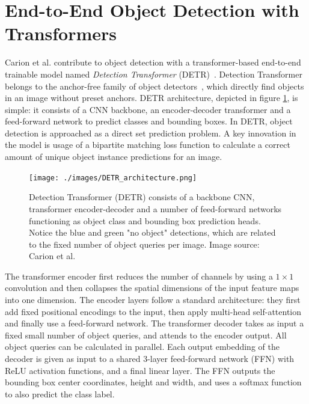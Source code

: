 \documentclass[english,twoside,openright]{HYgraduMLDS}
\begin{document}
\section{End-to-End Object Detection with Transformers}
\label{section:DETR}
Carion et al. contribute to object detection with a transformer-based end-to-end trainable model named \textit{Detection Transformer} (DETR)~\cite{DETR}. Detection Transformer belongs to the anchor-free family of object detectors~\cite{BridgingObjectAnchor}, which directly find objects in an image without preset anchors. DETR architecture, depicted in figure \ref{fig:DETR}, is simple: it consists of a CNN backbone, an encoder-decoder transformer and a feed-forward network to predict classes and bounding boxes. In DETR, object detection is approached as a direct set prediction problem. A key innovation in the model is usage of a bipartite matching loss function to calculate a correct amount of unique object instance predictions for an image. 

\begin{figure}[h] 
\centering
\texttt{[image: ./images/DETR\_architecture.png]}
\caption{Detection Transformer (DETR) consists of a backbone CNN, transformer encoder-decoder and a number of feed-forward networks functioning as object class and bounding box prediction heads. Notice the blue and green "no object" detections, which are related to the fixed number of object queries per image. Image source: Carion et al.~\cite{DETR}}
\label{fig:DETR} 
\end{figure}

The transformer encoder first reduces the number of channels by using a $1 \times 1$ convolution and then collapses the spatial dimensions of the input feature maps into one dimension. The encoder layers follow a standard architecture: they first add fixed positional encodings to the input, then apply multi-head self-attention and finally use a feed-forward network. The transformer decoder takes as input a fixed small number of object queries, and attends to the encoder output. All object queries can be calculated in parallel. Each output embedding of the decoder is given as input to a shared 3-layer feed-forward network (FFN) with ReLU activation functions, and a final linear layer. The FFN outputs the bounding box center coordinates, height and width, and uses a softmax function to also predict the class label.
\end{document}
